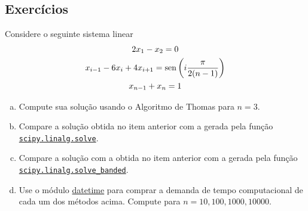 \subsection{Exercícios}

\begin{exer}\label{exer:sislin_tridiag}
  Considere o seguinte sistema linear
  \begin{gather}
    2x_1 - x_2 = 0\\
    x_{i-1} - 6x_i + 4x_{i+1} = \operatorname{sen}\left(i\frac{\pi}{2(n-1)}\right)\\
    x_{n-1} + x_n = 1
  \end{gather}
  \begin{enumerate}[a)]
  \item Compute sua solução usando o Algoritmo de Thomas para $n=3$.
  \item Compare a solução obtida no item anterior com a gerada pela função \href{https://docs.scipy.org/doc/scipy/reference/generated/scipy.linalg.solve.html}{\lstinline+scipy.linalg.solve+}.
  \item Compare a solução com a obtida no item anterior com a gerada pela função \href{https://docs.scipy.org/doc/scipy/reference/generated/scipy.linalg.solve_banded.html}{\lstinline+scipy.linalg.solve_banded+}.
  \item Use o módulo {\python} \href{https://docs.python.org/3/library/datetime.html?highlight=datetime#module-datetime}{datetime} para comprar a demanda de tempo computacional de cada um dos métodos acima. Compute para $n=10,100,1000,10000$.
  \end{enumerate}
\end{exer}

